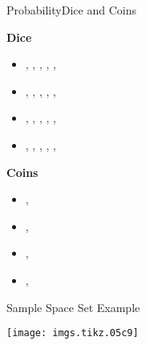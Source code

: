 \documentclass[\string~/GitHub/sthlmNordBeamerTheme/sthlmNordLightDemo.tex]{subfiles}
\begin{document}
\begin{frame}[c]{Probability}{Dice and Coins}
	\hfill\\
	\begin{minipage}[t]{0.45\textwidth}
		\vspace{0pt}
		\textbf{Dice}
		\begin{itemize}
			\item \gdicei, \gdiceii, \gdiceiii, \gdiceiv, \gdicev, \gdicevi
			\item \bdicei, \bdiceii, \bdiceiii, \bdiceiv, \bdicev, \bdicevi
			\item \abdicei, \abdiceii, \abdiceiii, \abdiceiv, \abdicev, \abdicevi
			\item \rdicei, \rdiceii, \rdiceiii, \rdiceiv, \rdicev, \rdicevi
		\end{itemize}
		\textbf{Coins}
		\begin{itemize}
			\item \gcheads, \gctails
			\item \bcheads, \bctails
			\item \abcheads, \abctails
			\item \rcheads, \rctails
		\end{itemize}
	\end{minipage}
	\hspace{0.05\textwidth}
	\begin{minipage}[t]{0.45\textwidth}
		\vspace{0pt}
		\begin{exampleblock}{Sample Space Set Example}
			\begin{center}
				\texttt{[image: imgs.tikz.05c9]}
			\end{center}
		\end{exampleblock}
	\end{minipage}
	\hfill


\end{frame}
\end{document}
